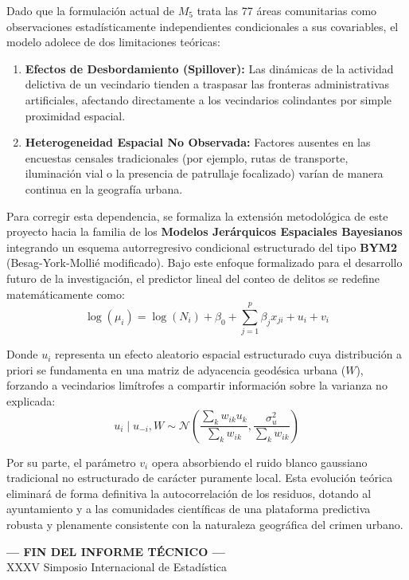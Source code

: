 \documentclass[11pt,a4paper]{article}
\begin{document}
Dado que la formulación actual de $M_5$ trata las 77 áreas comunitarias como observaciones estadísticamente independientes condicionales a sus covariables, el modelo adolece de dos limitaciones teóricas:
\begin{enumerate}
    \item \textbf{Efectos de Desbordamiento (Spillover):} Las dinámicas de la actividad delictiva de un vecindario tienden a traspasar las fronteras administrativas artificiales, afectando directamente a los vecindarios colindantes por simple proximidad espacial.
    \item \textbf{Heterogeneidad Espacial No Observada:} Factores ausentes en las encuestas censales tradicionales (por ejemplo, rutas de transporte, iluminación vial o la presencia de patrullaje focalizado) varían de manera continua en la geografía urbana.
\end{enumerate}

Para corregir esta dependencia, se formaliza la extensión metodológica de este proyecto hacia la familia de los \textbf{Modelos Jerárquicos Espaciales Bayesianos} integrando un esquema autorregresivo condicional estructurado del tipo \textbf{BYM2} (Besag-York-Mollié modificado). Bajo este enfoque formalizado para el desarrollo futuro de la investigación, el predictor lineal del conteo de delitos se redefine matemáticamente como:
\begin{equation}
\log(\mu_i) = \log(N_i) + \beta_0 + \sum_{j=1}^{p} \beta_j x_{ji} + u_i + v_i
\end{equation}

Donde $u_i$ representa un efecto aleatorio espacial estructurado cuya distribución a priori se fundamenta en una matriz de adyacencia geodésica urbana ($W$), forzando a vecindarios limítrofes a compartir información sobre la varianza no explicada:
\begin{equation}
u_i \mid u_{-i}, W \sim \mathcal{N}\left(\frac{\sum_{k} w_{ik} u_k}{\sum_{k} w_{ik}}, \frac{\sigma_u^2}{\sum_{k} w_{ik}}\right)
\end{equation}

Por su parte, el parámetro $v_i$ opera absorbiendo el ruido blanco gaussiano tradicional no estructurado de carácter puramente local. Esta evolución teórica eliminará de forma definitiva la autocorrelación de los residuos, dotando al ayuntamiento y a las comunidades científicas de una plataforma predictiva robusta y plenamente consistente con la naturaleza geográfica del crimen urbano.

\begin{center}
\vspace{1cm}
\textbf{--- FIN DEL INFORME TÉCNICO ---} \\
\small{XXXV Simposio Internacional de Estadística}
\end{center}
\end{document}
